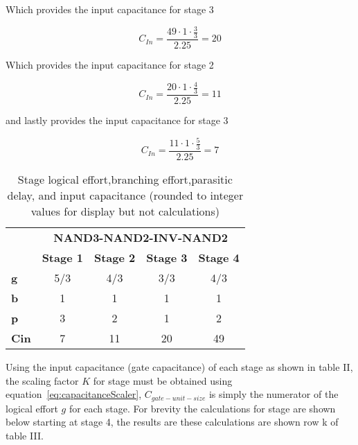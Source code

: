 \documentclass[conference]{IEEEtran}
\begin{document}
Which provides the input capacitance for stage 3

  $$ C_{In} = \frac{49\cdot1\cdot\frac{3}{3}}{2.25} = 20$$

Which provides the input capacitance for stage 2

  $$ C_{In} = \frac{20\cdot1\cdot\frac{4}{3}}{2.25} = 11$$

and lastly provides the input capacitance for stage 3

  $$ C_{In} = \frac{11\cdot1\cdot\frac{5}{3}}{2.25} = 7$$



\begin{table}[H]
\center
\begin{tabular}{l|c|c|c|c|}
\cline{2-5}
                                   & \multicolumn{4}{c|}{\textbf{NAND3-NAND2-INV-NAND2}}                                                                                                           \\ \cline{2-5} 
                                   & \multicolumn{1}{l|}{\textbf{Stage 1}} & \multicolumn{1}{l|}{\textbf{Stage 2}} & \multicolumn{1}{l|}{\textbf{Stage 3}} & \multicolumn{1}{l|}{\textbf{Stage 4}} \\ \hline
\multicolumn{1}{|l|}{\textbf{g}}   & 5/3                                   & 4/3                                   & 3/3                                   & 4/3                                   \\ \hline
\multicolumn{1}{|l|}{\textbf{b}}   & 1                                     & 1                                     & 1                                     & 1                                     \\ \hline
\multicolumn{1}{|l|}{\textbf{p}}   & 3                                     & 2                                     & 1                                     & 2                                     \\ \hline
\multicolumn{1}{|l|}{\textbf{Cin}} & 7                                     & 11                                    & 20                                    & 49                                    \\ \hline
\end{tabular}
\label{tab:StageCalcs}
\caption{Stage logical effort,branching effort,parasitic delay, and input capacitance (rounded to integer values for display but not calculations)}
\end{table}


Using the input capacitance (gate capacitance) of each stage as shown in table II, the scaling factor $K$ for stage must be obtained using equation~\ref{eq:capacitanceScaler}, $C_{gate-unit-size}$ is simply the numerator of the logical effort $g$ for each stage. For brevity the calculations for stage are shown below starting at stage 4, the results are these calculations are shown row k of table III.
\end{document}
